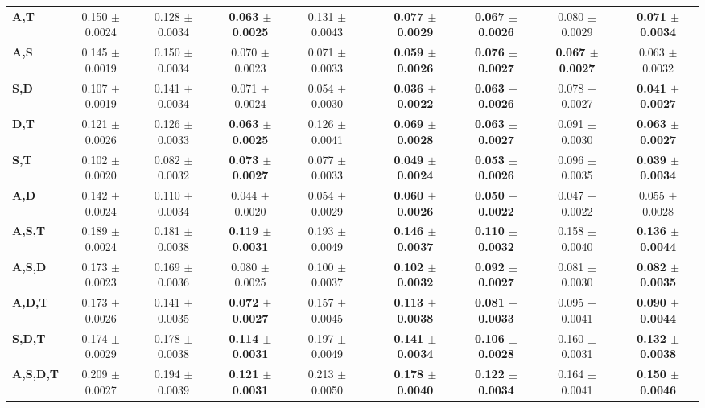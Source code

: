 \begin{table}[!htbp]
\begin{adjustbox}{angle=90}
\begin{tabular}{l|c|c|c|c|c|c|c|c|c|}
			\textbf{A,T} & 0.150 $\pm$ 0.0024 & 0.128 $\pm$ 0.0034 & \textbf{0.063 $\pm$ 0.0025} & 0.131 $\pm$ 0.0043 &  & \textbf{0.077 $\pm$ 0.0029} & \textbf{0.067 $\pm$ 0.0026} & 0.080 $\pm$ 0.0029 & \textbf{0.071 $\pm$ 0.0034} \\
			\textbf{A,S} & 0.145 $\pm$ 0.0019 & 0.150 $\pm$ 0.0034 & 0.070 $\pm$ 0.0023 & 0.071 $\pm$ 0.0033 &  & \textbf{0.059 $\pm$ 0.0026} & \textbf{0.076 $\pm$ 0.0027} & \textbf{0.067 $\pm$ 0.0027 } & 0.063 $\pm$ 0.0032 \\
			\textbf{S,D} & 0.107 $\pm$ 0.0019 & 0.141 $\pm$ 0.0034 & 0.071 $\pm$ 0.0024 & 0.054 $\pm$ 0.0030 &  & \textbf{0.036 $\pm$ 0.0022} & \textbf{0.063 $\pm$ 0.0026} & 0.078  $\pm$ 0.0027 & \textbf{0.041 $\pm$ 0.0027} \\
			\textbf{D,T} & 0.121 $\pm$ 0.0026 & 0.126 $\pm$ 0.0033 & \textbf{0.063 $\pm$ 0.0025} & 0.126 $\pm$ 0.0041 &  & \textbf{0.069 $\pm$ 0.0028} & \textbf{0.063 $\pm$ 0.0027} & 0.091  $\pm$ 0.0030 & \textbf{0.063 $\pm$ 0.0027} \\
			\textbf{S,T} & 0.102 $\pm$ 0.0020 & 0.082 $\pm$ 0.0032 & \textbf{0.073 $\pm$ 0.0027} & 0.077 $\pm$ 0.0033 &  & \textbf{0.049 $\pm$ 0.0024} & \textbf{0.053 $\pm$ 0.0026} & 0.096  $\pm$ 0.0035 & \textbf{0.039 $\pm$ 0.0034} \\
			\textbf{A,D} & 0.142 $\pm$ 0.0024 & 0.110 $\pm$ 0.0034 & 0.044 $\pm$ 0.0020 & 0.054 $\pm$ 0.0029 &  & \textbf{0.060 $\pm$ 0.0026} & \textbf{0.050 $\pm$ 0.0022} & 0.047  $\pm$ 0.0022 & 0.055 $\pm$ 0.0028 \\ \hline
			\textbf{A,S,T} & 0.189 $\pm$ 0.0024 & 0.181 $\pm$ 0.0038 & \textbf{0.119 $\pm$ 0.0031} & 0.193 $\pm$ 0.0049 &  & \textbf{0.146 $\pm$ 0.0037} & \textbf{0.110 $\pm$ 0.0032} & 0.158  $\pm$ 0.0040 & \textbf{0.136 $\pm$ 0.0044} \\
			\textbf{A,S,D} & 0.173 $\pm$ 0.0023 & 0.169 $\pm$ 0.0036 & 0.080 $\pm$ 0.0025 & 0.100 $\pm$ 0.0037 &  & \textbf{0.102 $\pm$ 0.0032} & \textbf{0.092 $\pm$ 0.0027} & 0.081  $\pm$ 0.0030 & \textbf{0.082 $\pm$ 0.0035} \\
			\textbf{A,D,T} & 0.173 $\pm$ 0.0026 & 0.141 $\pm$ 0.0035 & \textbf{0.072 $\pm$ 0.0027} & 0.157 $\pm$ 0.0045 &  & \textbf{0.113 $\pm$ 0.0038} & \textbf{0.081 $\pm$ 0.0033} & 0.095  $\pm$ 0.0041 & \textbf{0.090 $\pm$ 0.0044} \\
			\textbf{S,D,T} & 0.174 $\pm$ 0.0029 & 0.178 $\pm$ 0.0038 & \textbf{0.114 $\pm$ 0.0031} & 0.197 $\pm$ 0.0049 &  & \textbf{0.141 $\pm$ 0.0034} & \textbf{0.106 $\pm$ 0.0028} & 0.160  $\pm$ 0.0031 & \textbf{0.132 $\pm$ 0.0038} \\ \hline
			\textbf{A,S,D,T} & 0.209 $\pm$ 0.0027 & 0.194 $\pm$ 0.0039 & \textbf{0.121 $\pm$ 0.0031} & 0.213 $\pm$ 0.0050 &  & \textbf{0.178 $\pm$ 0.0040} & \textbf{0.122 $\pm$ 0.0034} & 0.164  $\pm$ 0.0041 & \textbf{0.150 $\pm$ 0.0046} \\
		\end{tabular}
	\end{adjustbox}
\end{table}


